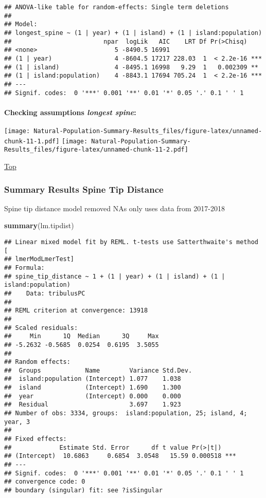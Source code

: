 \documentclass[
]{article}
\newenvironment{Shaded}{\begin{snugshade}}{\end{snugshade}}
\newcommand{\KeywordTok}[1]{\textcolor[rgb]{0.13,0.29,0.53}{\textbf{#1}}}
\newcommand{\NormalTok}[1]{#1}
\begin{document}
\begin{verbatim}
## ANOVA-like table for random-effects: Single term deletions
## 
## Model:
## longest_spine ~ (1 | year) + (1 | island) + (1 | island:population)
##                         npar  logLik   AIC    LRT Df Pr(>Chisq)    
## <none>                     5 -8490.5 16991                         
## (1 | year)                 4 -8604.5 17217 228.03  1  < 2.2e-16 ***
## (1 | island)               4 -8495.1 16998   9.29  1   0.002309 ** 
## (1 | island:population)    4 -8843.1 17694 705.24  1  < 2.2e-16 ***
## ---
## Signif. codes:  0 '***' 0.001 '**' 0.01 '*' 0.05 '.' 0.1 ' ' 1
\end{verbatim}

\hypertarget{checking-assumptions-longest-spine}{%
\paragraph{\texorpdfstring{Checking assumptions \emph{longest
spine}:}{Checking assumptions longest spine:}}\label{checking-assumptions-longest-spine}}

\texttt{[image: Natural-Population-Summary-Results\_files/figure-latex/unnamed-chunk-11-1.pdf]}
\texttt{[image: Natural-Population-Summary-Results\_files/figure-latex/unnamed-chunk-11-2.pdf]}

\protect\hyperlink{generalized-linear-model}{Top}

\hypertarget{summary-results-spine-tip-distance}{%
\subsubsection{Summary Results Spine Tip
Distance}\label{summary-results-spine-tip-distance}}

Spine tip distance model removed NAs only uses data from 2017-2018

\begin{Shaded}
\begin{Highlighting}[]
\KeywordTok{summary}\NormalTok{(lm.tipdist)}
\end{Highlighting}
\end{Shaded}

\begin{verbatim}
## Linear mixed model fit by REML. t-tests use Satterthwaite's method [
## lmerModLmerTest]
## Formula: 
## spine_tip_distance ~ 1 + (1 | year) + (1 | island) + (1 | island:population)
##    Data: tribulusPC
## 
## REML criterion at convergence: 13918
## 
## Scaled residuals: 
##     Min      1Q  Median      3Q     Max 
## -5.2632 -0.5685  0.0254  0.6195  3.5055 
## 
## Random effects:
##  Groups            Name        Variance Std.Dev.
##  island:population (Intercept) 1.077    1.038   
##  island            (Intercept) 1.690    1.300   
##  year              (Intercept) 0.000    0.000   
##  Residual                      3.697    1.923   
## Number of obs: 3334, groups:  island:population, 25; island, 4; year, 3
## 
## Fixed effects:
##             Estimate Std. Error      df t value Pr(>|t|)    
## (Intercept)  10.6863     0.6854  3.0548   15.59 0.000518 ***
## ---
## Signif. codes:  0 '***' 0.001 '**' 0.01 '*' 0.05 '.' 0.1 ' ' 1
## convergence code: 0
## boundary (singular) fit: see ?isSingular
\end{verbatim}
\end{document}

